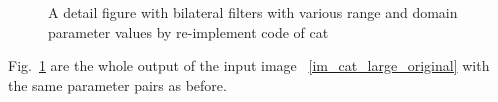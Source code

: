 \documentclass[12pt]{article}
\begin{document}
\begin{figure}[H]
  \quad
  \quad
  \quad
  \caption{A detail figure with bilateral filters with various range and domain parameter values by re-implement code of cat}
  \label{im_cat}
  \end{figure}

Fig.~\ref{im_cat} are the whole output of the input image ~\ref{im_cat_large_original} with the same parameter pairs as before.

\end{document}
